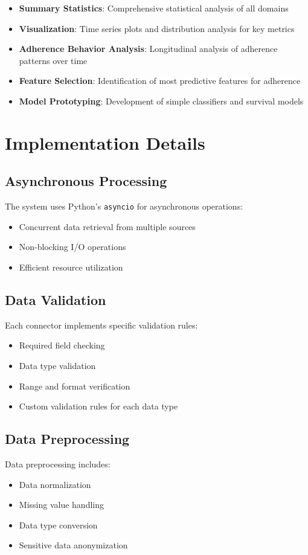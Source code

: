 \documentclass[12pt]{article}
\begin{document}
\begin{itemize}
    \item \textbf{Summary Statistics}: Comprehensive statistical analysis of all domains
    \item \textbf{Visualization}: Time series plots and distribution analysis for key metrics
    \item \textbf{Adherence Behavior Analysis}: Longitudinal analysis of adherence patterns over time
    \item \textbf{Feature Selection}: Identification of most predictive features for adherence
    \item \textbf{Model Prototyping}: Development of simple classifiers and survival models
\end{itemize}

\section{Implementation Details}

\subsection{Asynchronous Processing}
The system uses Python's \texttt{asyncio} for asynchronous operations:
\begin{itemize}
    \item Concurrent data retrieval from multiple sources
    \item Non-blocking I/O operations
    \item Efficient resource utilization
\end{itemize}

\subsection{Data Validation}
Each connector implements specific validation rules:
\begin{itemize}
    \item Required field checking
    \item Data type validation
    \item Range and format verification
    \item Custom validation rules for each data type
\end{itemize}

\subsection{Data Preprocessing}
Data preprocessing includes:
\begin{itemize}
    \item Data normalization
    \item Missing value handling
    \item Data type conversion
    \item Sensitive data anonymization
\end{itemize}
\end{document}
